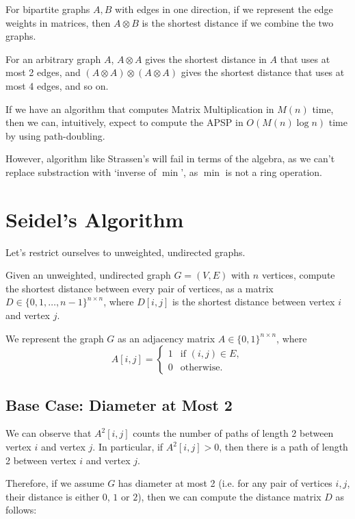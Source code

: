 For bipartite graphs $A, B$ with edges in one direction, if we represent the edge weights in matrices, then $A\otimes B$ is the shortest distance if we combine the two graphs.

For an arbitrary graph $A$, $A\otimes A$ gives the shortest distance in $A$ that uses at most 2 edges, and $(A\otimes A)\otimes (A\otimes A)$ gives the shortest distance that uses at most 4 edges, and so on.

If we have an algorithm that computes Matrix Multiplication in $M(n)$ time, then we can, intuitively, expect to compute the APSP in $O(M(n)\log n)$ time by using path-doubling.

However, algorithm like Strassen's will fail in terms of the algebra, as we can't replace substraction with `inverse of $\min$', as $\min$ is not a ring operation.

\section{Seidel's Algorithm}

Let's restrict ourselves to unweighted, undirected graphs.

\begin{problem}
Given an unweighted, undirected graph $G = (V,E)$ with $n$ vertices, compute the shortest distance between every pair of vertices, as a matrix $D\in \{0,1,\ldots, n-1\}^{n\times n}$, where $D[i,j]$ is the shortest distance between vertex $i$ and vertex $j$.
\end{problem}

We represent the graph $G$ as an adjacency matrix $A\in \{0,1\}^{n\times n}$, where
\[ A[i,j] = \begin{cases}
		1 & \text{if } (i,j)\in E, \\
		0 & \text{otherwise}.
	\end{cases} \]

\subsection{Base Case: Diameter at Most 2}

We can observe that $A^2[i,j]$ counts the number of paths of length 2 between vertex $i$ and vertex $j$. In particular, if $A^2[i,j] > 0$, then there is a path of length 2 between vertex $i$ and vertex $j$.

Therefore, if we assume $G$ has diameter at most 2 (i.e. for any pair of vertices $i,j$, their distance is either $0$, $1$ or $2$), then we can compute the distance matrix $D$ as follows:

